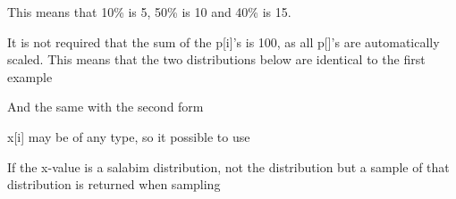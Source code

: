 \documentclass[letterpaper,10pt,english]{sphinxmanual}
\begin{document}
This means that 10\% is 5, 50\% is 10 and 40\% is 15.

It is not required that the sum of the p{[}i{]}’s is 100, as all p{[}{]}’s are automatically scaled. This means that the two distributions below are
identical to the first example

\begin{sphinxVerbatim}[commandchars=\\\{\}]
       
              
\end{sphinxVerbatim}

And the same with the second form

\begin{sphinxVerbatim}[commandchars=\\\{\}]
       
\end{sphinxVerbatim}

x{[}i{]} may be of any type, so it possible to use

\begin{sphinxVerbatim}[commandchars=\\\{\}]
     
\end{sphinxVerbatim}

If the x-value is a salabim distribution, not the distribution but a sample of that distribution is returned when sampling

\begin{sphinxVerbatim}[commandchars=\\\{\}]
          
\end{sphinxVerbatim}
\end{document}
